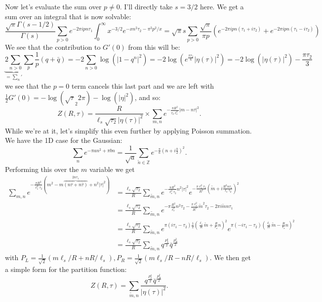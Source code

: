 \documentclass[11pt]{article}
\begin{document}
\begin{enumerate}
	Now let's evaluate the sum over $p \neq 0$. I'll directly take $s=3/2$ here. We get a sum over an integral that is now solvable:
	\[
		\frac{\sqrt{\pi} \Gamma(s-1/2)}{\Gamma(s)} \sum_{p > 0} e^{-2 \pi i p n \tau_1} \int_{0}^\infty x^{-3/2} e^{-x n^2 \tau_2 - \pi^2 p^2/x} = \sqrt{\pi} s \sum_{p > 0} \frac{\sqrt{\pi}}{\pi p} (e^{-2 \pi i p n (\tau_1 + i \tau_2)} + e^{-2 \pi i p n (\tau_1 - i \tau_2)})
	\]
	We see that the contribution to $G'(0)$ from this will be:
	\[
		\underbrace{2 \sum_{n > 0}}_{= {\sum_n}'} \sum_p \frac{1}{p} (q + \bar q) = - 2 \sum_{n>0} \log(|1-q^n|^2) = -2 \log( e^{\frac{\pi \tau_2}{6}} |\eta(\tau)|^2) = -2 \log(|\eta(\tau)|^2) - \frac{\pi \tau_2}{3}
	\]
	we see that the $p=0$ term cancels this last part and we are left with 
	$\frac12 G'(0) = -\log(\sqrt \tau_2 2 \pi) - \log(|\eta|^2)$, and so:
	\[
		Z(R, \tau) = \frac{R}{\ell_s \sqrt{\tau_2} |\eta(\tau)|^2} \times \sum_{m, n} e^{-\frac{\pi R^2}{\tau_2 \ell_s^2} |m - n \tau|^2}.
	\]
	While we're at it, let's simplify this even further by applying Poisson summation. We have the 1D case for the Gaussian:
	\[
		\sum_{n} e^{-\pi a n^2 + \pi b n} = \frac{1}{\sqrt a} \sum_{\tilde n \in \mathbb Z} e^{-\frac{\pi}{a} (n + i \frac{b}{2})^2}.
	\]
	Performing this over the $m$ variable we get
	\[
	\begin{aligned}
		\sum_{m, n} e^{- \frac{\pi R^2}{\ell_s^2 \tau_2} (m^2 - m \overbrace{(n \tau + n \bar \tau)}^{2 n \tau_1} +  n^2 |\tau|^2)}
		& = \frac{\ell_s \sqrt{\tau_2}}{R} \sum_{\tilde m, n} e^{-\frac{\pi R^2}{\ell_s^2 \tau_2} n^2 |\tau|^2} e^{-\frac{\pi \ell_s^2 \tau_2}{R^2} \left(\tilde m + i \frac{R^2 n \tau_1}{\ell_s \tau_2}\right)^2}\\
		&= \frac{\ell_s \sqrt{\tau_2}}{R} \sum_{\tilde m, n} e^{-\pi\frac{R^2}{\ell_s^2} n^2 \tau_2 - \frac{\pi \ell_s^2}{R^2} \tilde m^2 \tau_2 - 2 \pi i \tilde m n \tau_1}\\
		&= \frac{\ell_s \sqrt{\tau_2}}{R} \sum_{\tilde m, n} e^{\pi (i \tau_1 - \tau_2) \frac12 \left(\frac{\ell_s}{R} \tilde m + \frac{R}{\ell_s} n\right)^2 } e^{\pi (-i \tau_1 - \tau_2) \left(\frac{\ell_s}{R} \tilde m - \frac{R}{\ell_s} n\right)^2 }\\
		&= \frac{\ell_s \sqrt{\tau_2}}{R} \sum_{\tilde m, n} q^{\frac{P_L^2}{2}} \bar q^{\frac{P_R^2}{2}}
	\end{aligned}
	\]
	with $P_L = \frac{1}{\sqrt 2} (m \ell_s/R + n R/\ell_s), P_R = \frac{1}{\sqrt 2} (m \ell_s/R - n R/\ell_s)$. We then get a simple form for the partition function:
	\[
		Z(R, \tau) = \sum_{\tilde m, n} \frac{q^{\frac{P_L^2}{2}} \bar q^{\frac{P_R^2}{2}}}{|\eta(\tau)|^2}.
	\]
	

\end{enumerate}
\end{document}
